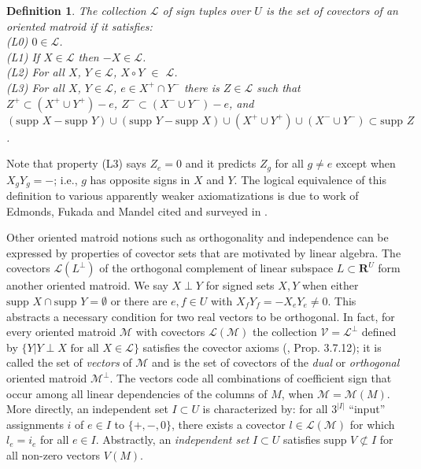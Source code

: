 \documentclass{article}
\def\Reals{\ensuremath{\mathbf R}}
\newtheorem{definition}{Definition}
\newcommand{\supp}[1]{{{\mbox{supp\ }#1}}}
\newcommand{\extra}[1]{{\small{#1}}}
\begin{document}
\begin{definition}
The collection $\mathcal{L}$ of sign tuples over $U$ is the set of 
\textit{covectors} of an oriented matroid if it satisfies:\\
(L0)
$0\in\mathcal{L}$.\\
(L1) If $X\in\mathcal{L}$ then $-X\in\mathcal{L}$.\\
(L2) For all $X$, $Y \in \mathcal{L}$, $X\circ Y$ $\in$ $\mathcal{L}$.\\
(L3) For all $X$, $Y \in \mathcal{L}$, $e\in X^+\cap Y^-$
there is
$Z\in\mathcal{L}$ such that 
$Z^+\subset(X^+\cup Y^+)-e$,
$Z^-\subset(X^-\cup Y^-)-e$, 
and 
$(\supp{X}-\supp{Y})\cup(\supp{Y}-\supp{X})\cup
(X^+\cup Y^+)\cup(X^-\cup Y^-)\subset\supp{Z}$.
\end{definition}
Note that property (L3) says $Z_e=0$ and it predicts $Z_g$ for all
$g\neq e$ except when $X_gY_g = -$; i.e., $g$ has opposite signs in
$X$ and $Y$.  The logical
equivalence of this definition to various apparently weaker
axiomatizations is due to work of Edmonds, Fukada and 
Mandel cited and surveyed in \cite{OMBOOK}.

Other oriented matroid 
notions such as orthogonality and 
independence can be expressed by properties of covector sets
that are motivated by linear algebra.
The covectors $\mathcal{L}(L^\perp)$ of the orthogonal complement
of linear subspace $L\subset\Reals^U$ form another oriented matroid.
We say $X\perp Y$ for signed sets $X,Y$ when 
either $\supp{X}\cap\supp{Y}=\emptyset$ or
there are $e,f\in U$
with $X_fY_f = -X_eY_e \neq 0$.
This abstracts a necessary condition for 
two real vectors to be orthogonal.
In fact, for every oriented matroid $\mathcal{M}$ with covectors
$\mathcal{L}(\mathcal{M})$
the collection $\mathcal{V}=\mathcal{L}^\perp$ defined by
$\{Y | Y\perp X \mbox{\ for all\ }X\in\mathcal{L}\}$ satisfies the
covector axioms (\cite{OMBOOK}, Prop. 3.7.12); it is called the 
set of \textit{vectors} of $\mathcal{M}$ and is the set of covectors
of the \textit{dual} or \textit{orthogonal} oriented matroid 
$\mathcal{M}^\perp$. The vectors code all combinations of coefficient 
sign that occur among all linear dependencies of the columns of $M$,
when $\mathcal{M}=\mathcal{M}(M)$.
\extra{More directly, an independent set $I\subset U$ is characterized by: 
for all $3^{|I|}$ ``input'' assignments $i$ of $e\in I$ to $\{+,-,0\}$, 
there exists a covector $l\in \mathcal{L}(\mathcal{M})$ for which
$l_e = i_e$ for all $e\in I$.}  Abstractly, an \textit{independent set}
$I\subset U$ satisfies $\supp{V}\not\subset I$ for all non-zero 
vectors $\mathit{V}(\mathit{M})$.
\end{document}
